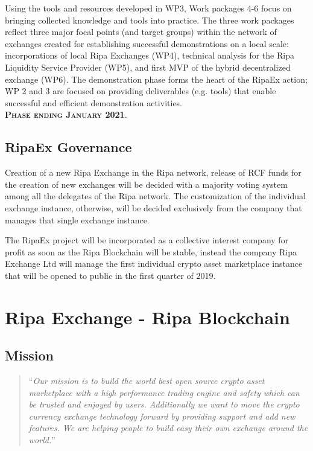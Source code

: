 \documentclass[11pt,fleqn,oneside]{book} %
\begin{document}
\begin{center}
\begin{tcolorbox}[roadmapBox,
		title=\textbf{\textsc{Development of hybrid-decentralized exchange (WP 4-6)}}]
		Using the tools and resources developed in WP3, 
		Work packages 4-6 focus on bringing collected knowledge and tools into practice. The three work packages reflect three major
		focal points (and target groups) within the network of exchanges created for establishing successful 
		demonstrations on a local scale: incorporations of local Ripa Exchanges (WP4), technical analysis for the 
		Ripa Liquidity Service Provider (WP5), and first MVP of the hybrid decentralized exchange (WP6). The demonstration
		phase forms the heart of the RipaEx action; WP 2 and 3 are focused on providing
		deliverables (e.g. tools) that enable successful and efficient demonstration activities.\\
		\vspace{1cm}
		\centering\textbf{\textsc{Phase ending January 2021}}.
	\end{tcolorbox}
\end{center}

\section{RipaEx Governance}
Creation of a new Ripa Exchange in the Ripa network, release of RCF funds for the creation of new exchanges will be
decided with a majority voting system among all the delegates of the Ripa network. The customization of the individual
exchange instance, otherwise, will be decided exclusively from the company that manages that single exchange
instance.

The RipaEx project will be incorporated as a collective interest company for profit as soon as the Ripa Blockchain
will be stable, instead the company Ripa Exchange Ltd will manage the first individual crypto asset marketplace
instance that will be opened to public in the first quarter of 2019.



\chapter{Ripa Exchange - Ripa Blockchain}

\section{Mission}
\begin{quotation}
	``\textit{Our mission is to build the world best open source crypto asset marketplace with a high performance trading engine 
	and safety which can be trusted and enjoyed by users. Additionally we want to move the crypto currency exchange technology 
	forward by providing support and add new features. We are helping people to build easy their own exchange around the world.}''
\end{quotation}
\end{document}
